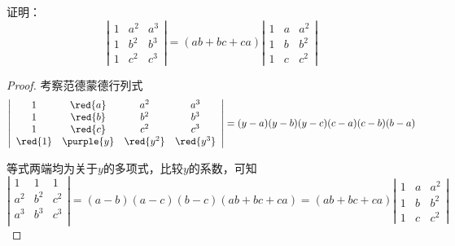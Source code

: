 \begin{frame}



\begin{testexample}
  证明：
  $$
  \left|
    \begin{array}{ccc}
      1&a^2&a^3\\
      1&b^2&b^3\\
      1&c^2&c^3
    \end{array}
  \right| = (ab+bc+ca)\left|
    \begin{array}{ccc}
      1&a&a^2\\
      1&b&b^2\\
      1&c&c^2
    \end{array}
  \right|
  $$
\end{testexample}\pause

\begin{proof}
考察范德蒙德行列式
$$
\left|
  \begin{array}{cccc}      
    1&\red{a}&a^2&a^3\\
    1&\red{b}&b^2&b^3\\
    1&\red{c}&c^2&c^3\\
    \red{1}&\purple{y}&\red{y^2}&\red{y^3}
  \end{array}
\right|
= (y-a)(y-b)(y-c)(c-a)(c-b)(b-a)
$$

等式两端均为关于$y$的多项式，比较$y$的系数，可知
$$
\left|
  \begin{array}{cccc}
    1   &   1   &   1  \\ 
    a^2 &   b^2 &   c^2  \\
    a^3 &   b^3 &   c^3\\
  \end{array}
\right| = (a-b)(a-c)(b-c)(ab+bc+ca) = (ab+bc+ca)\left|
  \begin{array}{ccc}
    1&a&a^2\\
    1&b&b^2\\
    1&c&c^2
  \end{array}
\right|
$$

\end{proof}
\end{frame}

